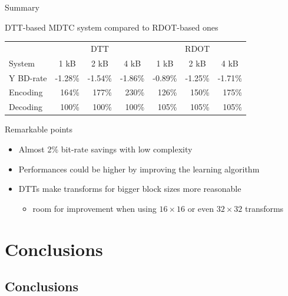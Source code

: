 \documentclass[10pt]{beamer} %
\begin{document}
\begin{frame}{Summary}
	\begin{block}{DTT-based MDTC system compared to RDOT-based ones}
		\vspace{1em}
		\begin{tabular}{l|r|r|r||r|r|r}
			& \multicolumn{3}{c||}{DTT} & \multicolumn{3}{c}{RDOT}\\
			System
			& \multicolumn{1}{c|}{1 kB}
			& \multicolumn{1}{c|}{2 kB}
			& \multicolumn{1}{c||}{4 kB}
			& \multicolumn{1}{c|}{1 kB}
			& \multicolumn{1}{c|}{2 kB}
			& \multicolumn{1}{c}{4 kB} \\
			\hline\hline
			Y BD-rate & -1.28\% & -1.54\% & -1.86\% & -0.89\% & -1.25\% & -1.71\% \\
			Encoding  &   164\% &   177\% &   230\% &   126\% &   150\% &   175\% \\
			Decoding  &   100\% &   100\% &   100\% &   105\% &   105\% &   105\% \\
		\end{tabular}
	\end{block}
	\begin{block}{Remarkable points}
		\begin{itemize}
			\item Almost 2\% bit-rate savings with low complexity
			\item Performances could be higher by improving the learning
				algorithm
			\item DTTs make transforms for bigger block sizes more reasonable
				\begin{itemize}
					\item room for improvement when using $16\times16$ or even
						$32\times32$ transforms
				\end{itemize}
		\end{itemize}
	\end{block}
\end{frame}

\section{Conclusions}

\subsection*{Conclusions}
\end{document}
